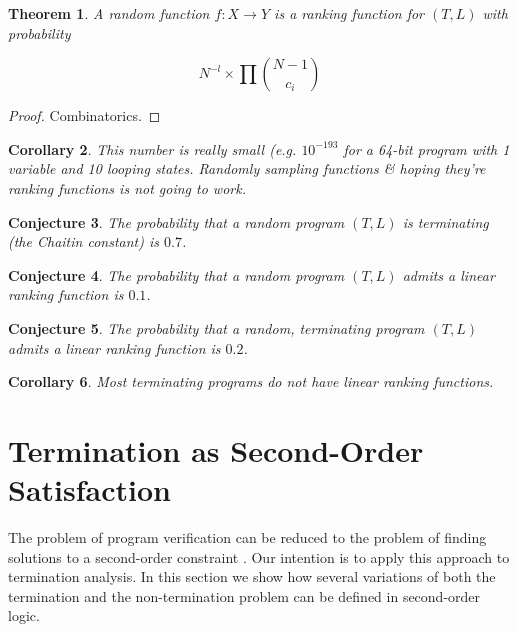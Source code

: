 \documentclass[preprint]{sigplanconf}
\newtheorem{theorem}{Theorem}
\newtheorem{corollary}[theorem]{Corollary}
\newtheorem{conjecture}[theorem]{Conjecture}
\theoremstyle{definition}
\begin{document}
\begin{theorem}
 A random function $f : X \to Y$ is a ranking function for $(T, L)$ with probability

 $$N^{-l} \times \prod {{N-1} \choose c_i}$$
\end{theorem}

\begin{proof}
 Combinatorics.
\end{proof}


\begin{corollary}
 This number is really small (e.g. $10^{-193}$ for a 64-bit program with 1 variable and 10 looping states.
 Randomly sampling functions \& hoping they're ranking functions is not going to work.
\end{corollary}


\begin{conjecture}
 The probability that a random program $(T, L)$ is terminating (the Chaitin constant)
 is $0.7$.
\end{conjecture}

\begin{conjecture}
 The probability that a random program $(T, L)$ admits a linear ranking function is
 $0.1$.
\end{conjecture}

\begin{conjecture}
 The probability that a random, terminating program $(T, L)$ admits a linear ranking function
 is $0.2$.
\end{conjecture}


\begin{corollary}
 Most terminating programs do not have linear ranking functions.
\end{corollary}
\fi


\section{Termination as Second-Order Satisfaction} \label{sec:second.order}



The problem of program verification can be reduced to the problem
of finding solutions to a second-order constraint \cite{DBLP:conf/pldi/GrebenshchikovLPR12,DBLP:conf/pldi/GulwaniSV08}. 
Our intention is to apply this approach to termination analysis. 
In this section we show how several variations of both the termination and the non-termination problem can be defined in second-order logic.  
\end{document}
